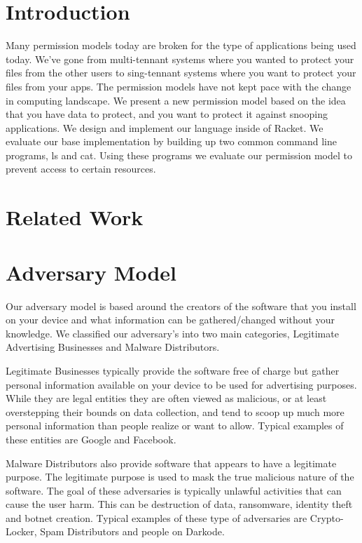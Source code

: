 \section{Introduction}\label{section:Introduction}
Many permission models today are broken for the type of applications being used today. We've gone from multi-tennant systems where you wanted to protect your files from the other users to sing-tennant systems where you want to protect your files from your apps. The permission models have not kept pace with the change in computing landscape. We present a new permission model based on the idea that you have data to protect, and you want to protect it against snooping applications. We design and implement our language inside of Racket\cite{racket}. We evaluate our base implementation by building up two common command line programs, ls and cat. Using these programs we evaluate our permission model to prevent access to certain resources.

\section{Related Work}\label{section:relatedwork}

\section{Adversary Model}\label{section:adversary-model}
Our adversary model is based around the creators of the software that you install on your device and what information can be gathered/changed without your knowledge. We classified our adversary's into two main categories, Legitimate Advertising Businesses and Malware Distributors.

Legitimate Businesses typically provide the software free of charge but gather personal information available on your device to be used for advertising purposes.  While they are legal entities they are often viewed as malicious, or at least overstepping their bounds on data collection, and tend to scoop up much more personal information than people realize or want to allow. Typical examples of these entities are Google and Facebook.  

Malware Distributors also provide software that appears to have a legitimate purpose. The legitimate purpose is used to mask the true malicious nature of the software. The goal of these adversaries is typically unlawful activities that can cause the user harm. This can be destruction of data, ransomware, identity theft and botnet creation. Typical examples of these type of adversaries are Crypto-Locker, Spam Distributors and people on Darkode.

